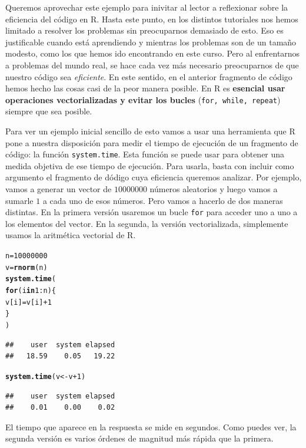 \documentclass[10pt,a4paper]{article}\usepackage[]{graphicx}\usepackage[]{color}
\makeatletter
\newcommand{\hlnum}[1]{\textcolor[rgb]{0.686,0.059,0.569}{#1}}%
\newcommand{\hlopt}[1]{\textcolor[rgb]{0,0,0}{#1}}%
\newcommand{\hlstd}[1]{\textcolor[rgb]{0.345,0.345,0.345}{#1}}%
\newcommand{\hlkwa}[1]{\textcolor[rgb]{0.161,0.373,0.58}{\textbf{#1}}}%
\newcommand{\hlkwb}[1]{\textcolor[rgb]{0.69,0.353,0.396}{#1}}%
\newcommand{\hlkwd}[1]{\textcolor[rgb]{0.737,0.353,0.396}{\textbf{#1}}}%
\newenvironment{kframe}{%
 \def\at@end@of@kframe{}%
 \ifinner\ifhmode%
  \def\at@end@of@kframe{\end{minipage}}%
  \begin{minipage}{\columnwidth}%
 \fi\fi%
 \def\FrameCommand##1{\hskip\@totalleftmargin \hskip-\fboxsep
 \colorbox{shadecolor}{##1}\hskip-\fboxsep
     \hskip-\linewidth \hskip-\@totalleftmargin \hskip\columnwidth}%
 \MakeFramed {\advance\hsize-\width
   \@totalleftmargin\z@ \linewidth\hsize
   \@setminipage}}%
 {\par\unskip\endMakeFramed%
 \at@end@of@kframe}
\newenvironment{knitrout}{}{} %
\newcounter {cont01}
\makeatother
\begin{document}
Queremos aprovechar este ejemplo para inivitar al lector a reflexionar sobre la eficiencia del código en R. Hasta este punto, en los distintos tutoriales nos hemos limitado a resolver los problemas sin preocuparnos demasiado de esto. Eso es justificable cuando está aprendiendo y mientras los problemas son de un tamaño modesto, como los que hemos ido encontrando en este curso. Pero al enfrentarnos a problemas del mundo real, se hace cada vez más necesario preocuparnos de que nuestro código sea {\em eficiente}. En este sentido, en el anterior fragmento de código hemos hecho las cosas casi de la peor manera posible. En R es {\bf esencial usar operaciones vectorializadas y evitar los bucles} ({\tt for, while, repeat}) siempre que sea posible.

Para ver un ejemplo inicial sencillo de esto vamos a usar una herramienta que R pone a nuestra disposición para medir el tiempo de ejecución de un fragmento de código: la función {\tt system.time}. Esta función se puede usar para obtener una medida objetiva de ese tiempo de ejecución. Para usarla, basta con incluir como argumento el fragmento de dódigo cuya eficiencia queremos analizar. Por ejemplo, vamos a generar un vector de $10000000$ números aleatorios y luego vamos a sumarle $1$ a cada uno de esos números. Pero vamos a hacerlo de dos maneras distintas. En la primera versión usaremos un bucle {\tt for} para acceder uno a uno a los elementos del vector. En la segunda, la versión vectorializada, simplemente usamos la aritmética vectorial de R.
\begin{knitrout}
\color{fgcolor}\begin{kframe}
\begin{alltt}
\hlstd{n} \hlkwb{=} \hlnum{10000000}
\hlstd{v} \hlkwb{=} \hlkwd{rnorm}\hlstd{(n)}
\hlkwd{system.time}\hlstd{(}
  \hlkwa{for} \hlstd{(i} \hlkwa{in} \hlnum{1}\hlopt{:}\hlstd{n)\{}
    \hlstd{v[i]} \hlkwb{=} \hlstd{v[i]} \hlopt{+} \hlnum{1}
  \hlstd{\}}
\hlstd{)}
\end{alltt}
\begin{verbatim}
##    user  system elapsed 
##   18.59    0.05   19.22
\end{verbatim}
\begin{alltt}
\hlkwd{system.time}\hlstd{(v} \hlkwb{<-} \hlstd{v} \hlopt{+}\hlnum{1}\hlstd{)}
\end{alltt}
\begin{verbatim}
##    user  system elapsed 
##    0.01    0.00    0.02
\end{verbatim}
\end{kframe}
\end{knitrout}
El tiempo que aparece en la respuesta se mide en segundos. Como puedes ver, la segunda versión es varios órdenes de magnitud más rápida que la primera.
\end{document}
